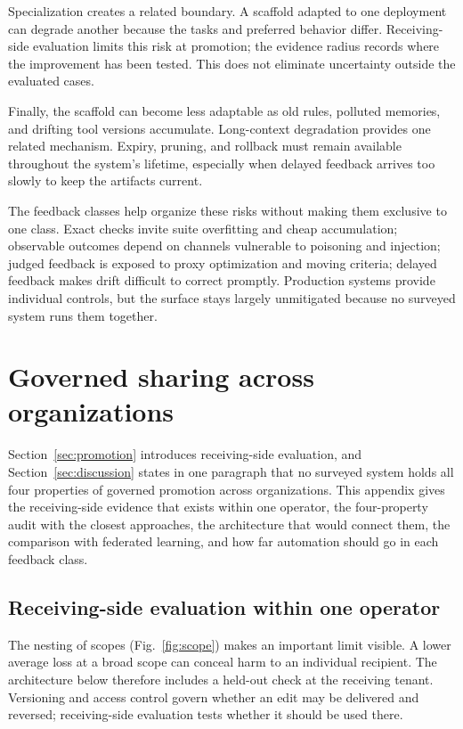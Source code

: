 Specialization creates a related boundary. A scaffold adapted to one deployment can degrade another because the tasks and preferred behavior differ. Receiving-side evaluation limits this risk at promotion; the evidence radius records where the improvement has been tested. This does not eliminate uncertainty outside the evaluated cases.

Finally, the scaffold can become less adaptable as old rules, polluted memories, and drifting tool versions accumulate. Long-context degradation \citep{liu2023lostmiddle} provides one related mechanism. Expiry, pruning, and rollback must remain available throughout the system's lifetime, especially when delayed feedback arrives too slowly to keep the artifacts current.

The feedback classes help organize these risks without making them exclusive to one class. Exact checks invite suite overfitting and cheap accumulation; observable outcomes depend on channels vulnerable to poisoning and injection; judged feedback is exposed to proxy optimization and moving criteria; delayed feedback makes drift difficult to correct promptly. Production systems provide individual controls, but the surface stays largely unmitigated because no surveyed system runs them together.

\section{Governed sharing across organizations}\label{app:governed}

Section~\ref{sec:promotion} introduces receiving-side evaluation, and Section~\ref{sec:discussion} states in one paragraph that no surveyed system holds all four properties of governed promotion across organizations. This appendix gives the receiving-side evidence that exists within one operator, the four-property audit with the closest approaches, the architecture that would connect them, the comparison with federated learning, and how far automation should go in each feedback class.

\subsection{Receiving-side evaluation within one operator}\label{receiving-side-evaluation-within-one-operator}

The nesting of scopes (Fig.~\ref{fig:scope}) makes an important limit visible. A lower average loss at a broad scope can conceal harm to an individual recipient. The architecture below therefore includes a held-out check at the receiving tenant. Versioning and access control govern whether an edit may be delivered and reversed; receiving-side evaluation tests whether it should be used there.

